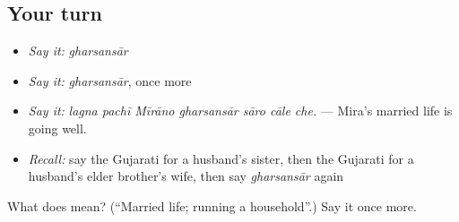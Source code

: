 \subsection*{Your turn}
\begin{itemize}
\raggedright
  \item \emph{Say it:} \emph{gharsansār}
  \item \emph{Say it:} \emph{gharsansār}, once more
  \item \emph{Say it:} \emph{lagna pachī Mīrāno gharsansār sāro cāle che.} — Mira's married life is going well.
  \item \emph{Recall:} say the Gujarati for a husband's sister, then the Gujarati for a husband's elder brother's wife, then say \emph{gharsansār} again
\end{itemize}

\begin{tcolorbox}[breakable,colback=teal!4,colframe=teal!35!black,title={Before you move on}]
What does  mean? (\textquotedblleft{}Married life; running a household\textquotedblright{}.) Say it once more.
\end{tcolorbox}
